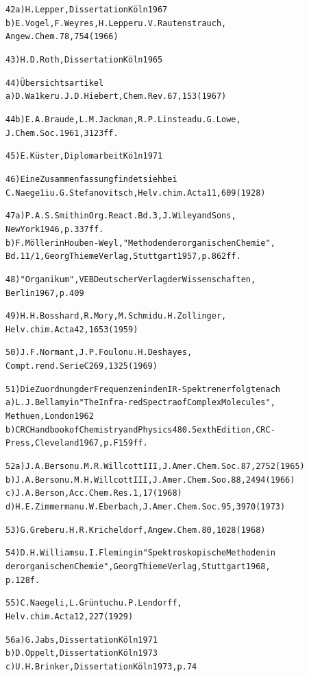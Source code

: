\documentclass[a4paper,11pt]{article}
\begin{document}
\begin{alltt}
42 a) H.Lepper, Dissertation Köln 1967
   b) E.Vogel, F.Weyres, H.Lepper u. V.Rautenstrauch,
      Angew.Chem. 78, 754 (1966)

43)   H.D.Roth, Dissertation Köln 1965

44)   Übersichtsartikel
   a) D.Wa1ker u. J.D.Hiebert, Chem.Rev. 67, 153 (1967)
\newpage
{}


44 b) E.A.Braude, L.M.Jackman, R.P.Linstead u. G.Lowe,
      J.Chem.Soc. 1961, 3123 ff.

45)   E.Küster, Diplomarbeit Kö1n 1971

46)   Eine Zusammenfassung findet sieh bei
      C.Naege1i u. G.Stefanovitsch, Helv.chim.Acta 11, 609 (1928)

47 a) P.A.S.Smith in Org.React. Bd. 3, J.Wiley and Sons,
      New York 1946, p. 337 ff.
   b) F.Möller in Houben-Weyl, "Methoden der organischen Chemie",
      Bd. 11/1, Georg Thieme Verlag, Stuttgart 1957, p. 862 ff.

48)   "Organikum", VEB Deutscher Verlag der Wissenschaften,
      Berlin 1967, p. 409

49)   H.H.Bosshard, R.Mory, M.Schmid u. H.Zollinger,
      Helv.chim.Acta 42, 1653 (1959)

50)   J.F.Normant, J.P.Foulon u. H.Deshayes,
      Compt.rend.Serie C269, 1325 (1969)

51)   Die Zuordnung der Frequenzen in den IR-Spektren erfolgte nach
   a) L.J.Bellamy in "The Infra-red Spectra of Complex Molecules",
      Methuen, London 1962
   b) CRC Handbook of Chemistry and Physics 48\raise0.5ex\hbox{th} Edition, CRC-
      Press, Cleveland 1967, p. F 159 ff.

52 a) J.A.Berson u. M.R.Willcott III, J.Amer.Chem.Soc. 87, 2752 (1965)
   b) J.A.Berson u. M.H.Willcott III, J.Amer.Chem.Soo. 88, 2494 (1966)
   c) J.A.Berson, Acc.Chem.Res. 1, 17 (1968)
   d) H.E.Zimmerman u. W.Eberbach, J.Amer.Chem.Soc. 95, 3970 (1973)

53)   G.Greber u. H.R.Kricheldorf, Angew.Chem. 80, 1028 (1968)

54)   D.H.Williams u. I.Fleming in "Spektroskopische Methoden in
      der organischen Chemie", Georg Thieme Verlag, Stuttgart 1968,
      p. 128 f.

55)   C.Naegeli, L.Grüntuch u. P.Lendorff,
      Helv.chim.Acta 12, 227 (1929)

56 a) G.Jabs, Dissertation Köln 1971
   b) D.Oppelt, Dissertation Köln 1973
   c) U.H.Brinker, Dissertation Köln 1973, p. 74


\end{alltt}
\end{document}
